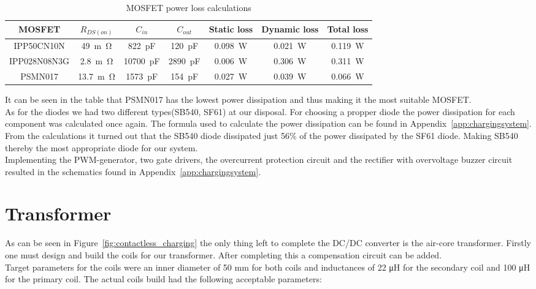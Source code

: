 \documentclass[11pt,titlepage]{report}
\begin{document}
\begin{table}[H]
	\centering
	\begin{tabular}{c c c c c c c}
		\hline\hline
		MOSFET & $R_{DS(on)}$ & $C_{in}$ & $C_{out}$ & Static loss & Dynamic loss & Total loss \\
		\hline
		IPP50CN10N & \SI{49}{m\ohm} & \SI{822}{pF} & \SI{120}{pF} & \SI{0.098}{W} & \SI{0.021}{W} & \SI{0.119}{W} \\
		IPP028N08N3G & \SI{2.8}{m\ohm} & \SI{10700}{pF} & \SI{2890}{pF} & \SI{0.006}{W} & \SI{0.306}{W} & \SI{0.311}{W} \\
		PSMN017 & \SI{13.7}{m\ohm} & \SI{1573}{pF} & \SI{154}{pF} & \SI{0.027}{W} & \SI{0.039}{W} & \SI{0.066}{W} \\
		\hline
		\end{tabular}
		\caption{MOSFET power loss calculations}
	    \label{ass2_power_loss}
\end{table}

It can be seen in the table that PSMN017 has the lowest power dissipation and thus making it the most suitable MOSFET. \\ 
As for the diodes we had two different types(SB540, SF61) at our disposal. For choosing a propper diode the power dissipation for each component was calculated once again. The formula used to calculate the power dissipation can be found in Appendix~\ref{app:chargingsystem}. From the calculations it turned out that the SB540 diode dissipated just 56\% of the power dissipated by the SF61 diode. Making SB540 thereby the most appropriate diode for our system. \\ 
Implementing the PWM-generator, two gate drivers, the overcurrent protection circuit and the rectifier
with overvoltage buzzer circuit resulted in the schematics found in Appendix~\ref{app:chargingsystem}. 


\section{Transformer}
As can be seen in Figure~\ref{fig:contactless_charging} the only thing left to complete the DC/DC converter is the air-core transformer. Firstly one must design and build the coils for our transformer. After completing this a compensation circuit can be added. \\
Target parameters for the coils were an inner diameter of 50 mm for both coils and inductances of 22 μH for the secondary coil and 100 μH for the primary coil. The actual coils build had the following acceptable parameters:
\end{document}
